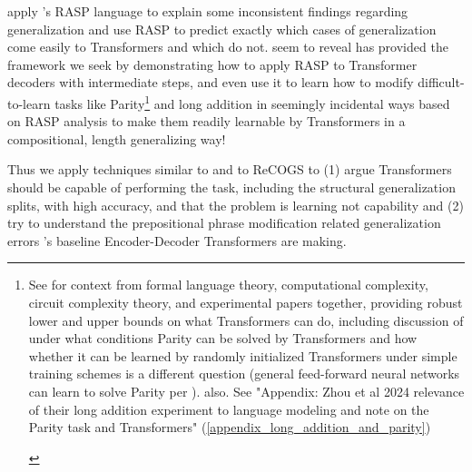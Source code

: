\documentclass[11pt]{article}
\begin{document}
\citep{Zhou2024} apply \citep{Weiss2021}'s RASP language to explain some inconsistent findings regarding generalization and use RASP to predict exactly which cases of generalization come easily to Transformers and which do not. \citep{Zhou2024} seem to reveal \citep{Weiss2021} has provided the framework we seek by demonstrating how to apply RASP to Transformer decoders with intermediate steps, and even use it to learn how to modify difficult-to-learn tasks like Parity\footnote{\begin{footnotesize}See \citep{Strobl2024} for context from formal language theory, computational complexity, circuit complexity theory, and experimental papers together, providing robust lower and upper bounds on what Transformers can do, including discussion of under what conditions Parity can be solved by Transformers and how whether it can be learned by randomly initialized Transformers under simple training schemes is a different question (general feed-forward neural networks can learn to solve Parity per \citep{10.7551/mitpress/4943.003.0128}). \citep{delétang2023neuralnetworkschomskyhierarchy} also. See "Appendix: Zhou et al 2024 relevance of their long addition experiment to language modeling and note on the Parity task and Transformers" (\ref{appendix_long_addition_and_parity})\end{footnotesize}} and long addition in seemingly incidental ways based on RASP analysis to make them readily learnable by Transformers in a compositional, length generalizing way!

Thus we apply techniques similar to \citep{Zhou2024} and \citep{Weiss2021} to ReCOGS to (1) argue Transformers should be capable of performing the task, including the structural generalization splits, with high accuracy, and that the problem is learning not capability and (2) try to understand the prepositional phrase modification related generalization errors \citep{Wu2023}'s baseline Encoder-Decoder Transformers are making.
\end{document}
